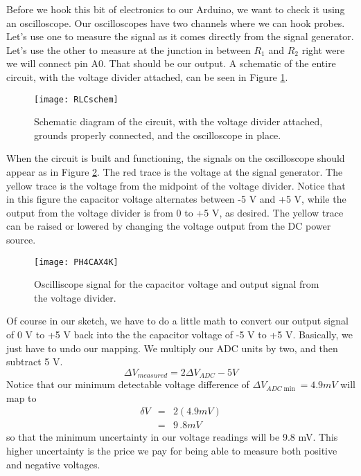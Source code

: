 Before we hook this bit of electronics to our Arduino, we want to check it
using an oscilloscope.
Our oscilloscopes have two channels where we can hook probes. Let's use one
to measure the signal as it comes directly from the signal generator. Let's
use the other to measure at the junction in between $R_{1}$ and $R_{2}$
right were we will connect pin A0. That should be our output. 
A schematic of the entire circuit, with the voltage divider attached,
can be seen in Figure \ref{fig:rlc_schematic}.

\begin{figure}[htbp!]
	\centering
	\texttt{[image: RLCschem]}
	\caption[Schematic diagram of the circuit, with the
	voltage divider attached]{Schematic diagram of the 
	circuit, with the 
	voltage divider attached, grounds properly connected, and the
	oscilloscope in place.}
	\label{fig:rlc_schematic}
\end{figure}

When the circuit is built and functioning, the signals on the oscilloscope
should appear as in Figure \ref{fig:rlc_osc}.
The red trace is the voltage at the signal generator.
The yellow trace is the voltage from the midpoint of the voltage divider. 
Notice that in this figure the capacitor voltage alternates between
-5 V and +5 V, while the output from the voltage divider is from 0 to +5 V,
as desired. The yellow trace can be raised or lowered by changing the voltage
output from the DC power source.
\begin{figure}[htbp!]
	\centering
	\texttt{[image: PH4CAX4K]}
	\caption{Oscilliscope signal for the capacitor voltage and output
	signal from the voltage divider.}
	\label{fig:rlc_osc}
\end{figure}

Of course in our sketch, we have to do a little math to convert our 
output signal of 0 V to +5 V back into the the capacitor voltage of
-5 V to +5 V. Basically, we just have to undo our mapping. We multiply our
ADC units by two, and then subtract 5 V.
\begin{equation}
\Delta V_{measured}=2\Delta V_{ADC}-5\unit{V}
\end{equation}
Notice that our minimum detectable voltage difference of $\Delta V_{ADC\min
}=4.9\unit{mV}$ will map to 
\begin{eqnarray*}
\delta V &=&2\left( 4.9\unit{mV}\right) \\
&=&9\,.8\unit{mV}
\end{eqnarray*}
so that the minimum uncertainty in our voltage readings will be 9.8 mV.
This higher uncertainty is the price we pay for being able to measure both
positive and negative voltages.

